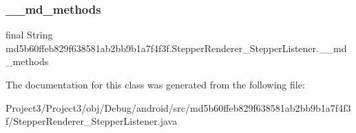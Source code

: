 \subsubsection{\texorpdfstring{\+\_\+\+\_\+md\+\_\+methods}{\_\_md\_methods}}
{\footnotesize\ttfamily final String md5b60ffeb829f638581ab2bb9b1a7f4f3f.\+Stepper\+Renderer\+\_\+\+Stepper\+Listener.\+\_\+\+\_\+md\+\_\+methods\hspace{0.3cm}{\ttfamily [static]}}



The documentation for this class was generated from the following file\+:\begin{DoxyCompactItemize}
\item 
Project3/\+Project3/obj/\+Debug/android/src/md5b60ffeb829f638581ab2bb9b1a7f4f3f/Stepper\+Renderer\+\_\+\+Stepper\+Listener.\+java\end{DoxyCompactItemize}
